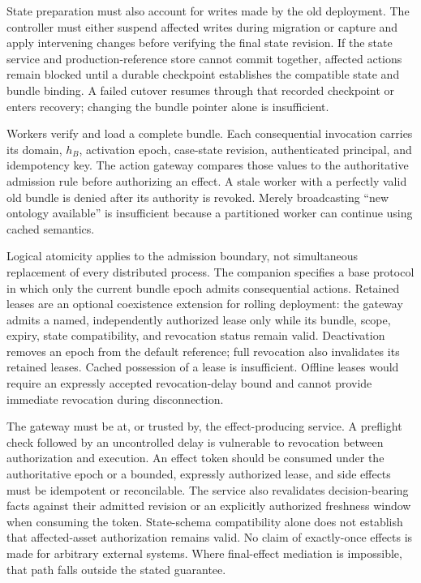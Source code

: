 \documentclass[preprint,12pt,authoryear]{elsarticle}
\begin{document}
State preparation must also account for writes made by the old
deployment. The controller must either suspend affected writes during
migration or capture and apply intervening changes before verifying the
final state revision. If the state service and production-reference
store cannot commit together, affected actions remain blocked until a
durable checkpoint establishes the compatible state and bundle binding.
A failed cutover resumes through that recorded checkpoint or enters
recovery; changing the bundle pointer alone is insufficient.

Workers verify and load a complete bundle. Each consequential invocation
carries its domain, \(h_B\), activation epoch, case-state revision,
authenticated principal, and idempotency key. The action gateway
compares those values to the authoritative admission rule before
authorizing an effect. A stale worker with a perfectly valid old bundle
is denied after its authority is revoked. Merely broadcasting ``new
ontology available'' is insufficient because a partitioned worker can
continue using cached semantics.

Logical atomicity applies to the admission boundary, not simultaneous
replacement of every distributed process. The companion specifies a base
protocol in which only the current bundle epoch admits consequential
actions. Retained leases are an optional coexistence extension for
rolling deployment: the gateway admits a named, independently authorized
lease only while its bundle, scope, expiry, state compatibility, and
revocation status remain valid. Deactivation removes an epoch from the
default reference; full revocation also invalidates its retained leases.
Cached possession of a lease is insufficient. Offline leases would
require an expressly accepted revocation-delay bound and cannot provide
immediate revocation during disconnection.

The gateway must be at, or trusted by, the effect-producing service. A
preflight check followed by an uncontrolled delay is vulnerable to
revocation between authorization and execution. An effect token should
be consumed under the authoritative epoch or a bounded, expressly
authorized lease, and side effects must be idempotent or reconcilable.
The service also revalidates decision-bearing facts against their
admitted revision or an explicitly authorized freshness window when
consuming the token. State-schema compatibility alone does not establish
that affected-asset authorization remains valid. No claim of
exactly-once effects is made for arbitrary external systems. Where
final-effect mediation is impossible, that path falls outside the stated
guarantee.
\end{document}
